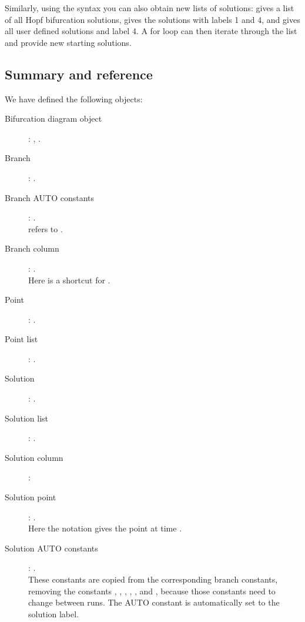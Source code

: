 \documentclass[12pt]{report}
\begin{document}
 Similarly, using the \commandf{()} syntax you can also obtain new lists of
 solutions:  gives a list of all Hopf bifurcation
 solutions,  gives the solutions with labels 1 and 4,
 and  gives all user defined solutions and
 label 4. A for loop can then iterate through the list and provide new
 starting solutions.

 \subsection{Summary and reference}
 We have defined the following objects:
 \begin{description}
   \item[Bifurcation diagram object]:
    , .
   \item[Branch]:
    .
   \item[Branch AUTO constants]:
    .\\
     refers to .
   \item[Branch column]:
    .\\
    Here  is a shortcut for .
   \item[Point]:
    .
   \item[Point list]:
    .
   \item[Solution]:
    .
   \item[Solution list]:
    .
   \item[Solution column]:
   \item[Solution point]:
    .\\
    Here the  notation gives the point at
    time .
   \item[Solution AUTO constants]:
    .\\
    These constants are copied from the corresponding branch
    constants, removing the constants , , ,
    , , and , because those constants need
    to change between runs. The AUTO constant
     is automatically set to the solution label.
 \end{description}
\end{document}
